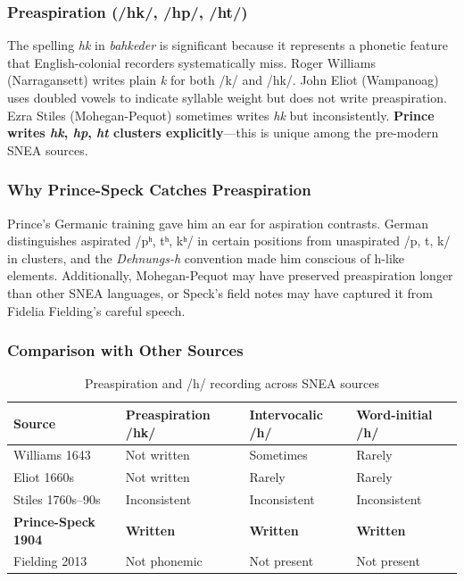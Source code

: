 \subsubsection{Preaspiration (/hk/, /hp/, /ht/)}

The spelling \textit{hk} in \textit{bahkeder} is significant because it
represents a phonetic feature that English-colonial recorders systematically
miss. Roger Williams (Narragansett) writes plain \textit{k} for both /k/ and
/hk/. John Eliot (Wampanoag) uses doubled vowels to indicate syllable weight
but does not write preaspiration. Ezra Stiles (Mohegan-Pequot) sometimes
writes \textit{hk} but inconsistently. \textbf{Prince writes \textit{hk},
\textit{hp}, \textit{ht} clusters explicitly}---this is unique among the
pre-modern SNEA sources.

\subsubsection{Why Prince-Speck Catches Preaspiration}

Prince's Germanic training gave him an ear for aspiration contrasts. German
distinguishes aspirated /pʰ, tʰ, kʰ/ in certain positions from unaspirated
/p, t, k/ in clusters, and the \textit{Dehnungs-h} convention made him
conscious of h-like elements. Additionally, Mohegan-Pequot may have preserved
preaspiration longer than other SNEA languages, or Speck's field notes may
have captured it from Fidelia Fielding's careful speech.

\subsubsection{Comparison with Other Sources}

\begin{table}[h]
\centering
\begin{tabular}{llll}
\toprule
\textbf{Source} & \textbf{Preaspiration /hk/} & \textbf{Intervocalic /h/} & \textbf{Word-initial /h/} \\
\midrule
Williams 1643 & Not written & Sometimes & Rarely \\
Eliot 1660s & Not written & Rarely & Rarely \\
Stiles 1760s--90s & Inconsistent & Inconsistent & Inconsistent \\
\textbf{Prince-Speck 1904} & \textbf{Written} & \textbf{Written} & \textbf{Written} \\
Fielding 2013 & Not phonemic & Not present & Not present \\
\bottomrule
\end{tabular}
\caption{Preaspiration and /h/ recording across SNEA sources}
\label{tab:1368-preaspiration}
\end{table}

